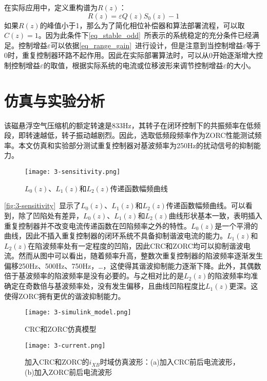 \documentclass[
  lang=cn,
  degree=master,
  openany,oneside
]{nuaathesis}
\begin{document}
在实际应用中，定义重构谱为$R(z)$：
\begin{equation}
	\label{eq_Rz}
	R(z)=\varepsilon Q(z)S_0(z)	- 1
\end{equation}
如果$R(z)$的峰值小于1，那么为了简化相位补偿器和算法部署流程，可以取$C(z)=1$。因为此条件下\autoref{eq_stable_odd}~所表示的系统稳定的充分条件已经满足。控制增益$\varepsilon$可以依据\autoref{eq_range_gain}~进行设计，但是注意到当控制增益$\varepsilon$等于$0$时，重复控制器环路不起作用。因此在实际部署算法时，可以从$0$开始逐渐增大控制控制增益$\varepsilon$的取值，根据实际系统的电流或位移波形来调节控制增益$\varepsilon$的大小。
\section{仿真与实验分析}

该磁悬浮空气压缩机的额定转速是833Hz，其转子在闭环控制下的共振频率在低频段，即转速越低，转子振动越剧烈。因此，选取低频段频率作为ZORC性能测试频率。本文仿真和实验部分测试重复控制器对基波频率为250Hz的扰动信号的抑制能力。
\begin{figure}[h!]
	\texttt{[image: 3-sensitivity.png]}
	\caption{$L_0(z)$、$L_1(z)$和$L_2(z)$传递函数幅频曲线}
	\label{fig:3-sensitivity}
\end{figure}

\autoref{fig:3-sensitivity}~显示了$L_0(z)$、$L_1(z)$和$L_2(z)$传递函数幅频曲线。可以看到，除了凹陷处有差异，$L_0(z)$、$L_1(z)$和$L_2(z)$曲线形状基本一致，表明插入重复控制器并不改变电流传递函数在凹陷频率之外的特性。$L_0(z)$是一个平滑的曲线，因此不插入重复控制器的闭环系统不具备抑制谐波电流的能力。$L_1(z)$和$L_2(z)$在陷波频率处有一定程度的凹陷，因此CRC和ZORC均可以抑制谐波电流。然而从图中可以看出，随着频率升高，整数次重复控制器的陷波频率逐渐发生偏移250Hz、500Hz、750Hz，…，这使得其谐波抑制能力逐渐下降。此外，其偶数倍于基波频率的陷波频率是没有必要的。与之相对比的是$L_2(z)$的陷波频率均准确定在奇数倍与基波频率处，没有发生偏移，且曲线凹陷程度比$L_1(z)$更深。这使得ZORC拥有更优的谐波抑制能力。

\begin{figure}[h!]
	\texttt{[image: 3-simulink\_model.png]}
	\caption{CRC和ZORC仿真模型}
	\label{fig:3-simulink_model}
\end{figure}

\begin{figure}[h!]
	\texttt{[image: 3-current.png]}
	\caption{加入CRC和ZORC的$i_{XB}$时域仿真波形：(a)加入CRC前后电流波形，(b)加入ZORC前后电流波形}
	\label{fig:3-current}
\end{figure}
\end{document}
